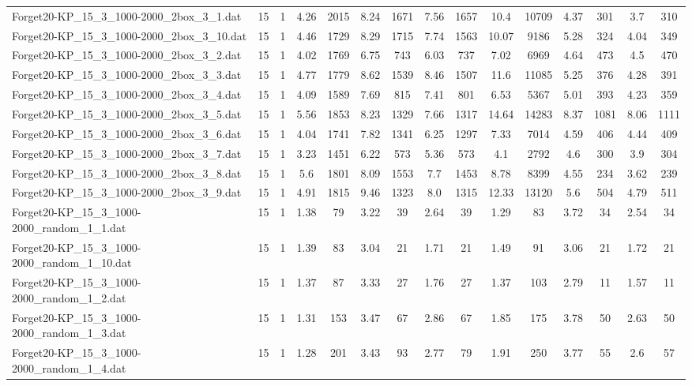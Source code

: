 \begin{table}[!ht]
{\begin{tabular}{lcccccccccccccc}
Forget20-KP\_15\_3\_1000-2000\_2box\_3\_1.dat & 15 & 1 & 4.26 & 2015 & 8.24 & 1671 & 7.56 & 1657 & 10.4 & 10709 & 4.37 & 301 & 3.7 & 310 \\
Forget20-KP\_15\_3\_1000-2000\_2box\_3\_10.dat & 15 & 1 & 4.46 & 1729 & 8.29 & 1715 & 7.74 & 1563 & 10.07 & 9186 & 5.28 & 324 & 4.04 & 349 \\
Forget20-KP\_15\_3\_1000-2000\_2box\_3\_2.dat & 15 & 1 & 4.02 & 1769 & 6.75 & 743 & 6.03 & 737 & 7.02 & 6969 & 4.64 & 473 & 4.5 & 470 \\
Forget20-KP\_15\_3\_1000-2000\_2box\_3\_3.dat & 15 & 1 & 4.77 & 1779 & 8.62 & 1539 & 8.46 & 1507 & 11.6 & 11085 & 5.25 & 376 & 4.28 & 391 \\
Forget20-KP\_15\_3\_1000-2000\_2box\_3\_4.dat & 15 & 1 & 4.09 & 1589 & 7.69 & 815 & 7.41 & 801 & 6.53 & 5367 & 5.01 & 393 & 4.23 & 359 \\
Forget20-KP\_15\_3\_1000-2000\_2box\_3\_5.dat & 15 & 1 & 5.56 & 1853 & 8.23 & 1329 & 7.66 & 1317 & 14.64 & 14283 & 8.37 & 1081 & 8.06 & 1111 \\
Forget20-KP\_15\_3\_1000-2000\_2box\_3\_6.dat & 15 & 1 & 4.04 & 1741 & 7.82 & 1341 & 6.25 & 1297 & 7.33 & 7014 & 4.59 & 406 & 4.44 & 409 \\
Forget20-KP\_15\_3\_1000-2000\_2box\_3\_7.dat & 15 & 1 & 3.23 & 1451 & 6.22 & 573 & 5.36 & 573 & 4.1 & 2792 & 4.6 & 300 & 3.9 & 304 \\
Forget20-KP\_15\_3\_1000-2000\_2box\_3\_8.dat & 15 & 1 & 5.6 & 1801 & 8.09 & 1553 & 7.7 & 1453 & 8.78 & 8399 & 4.55 & 234 & 3.62 & 239 \\
Forget20-KP\_15\_3\_1000-2000\_2box\_3\_9.dat & 15 & 1 & 4.91 & 1815 & 9.46 & 1323 & 8.0 & 1315 & 12.33 & 13120 & 5.6 & 504 & 4.79 & 511 \\
Forget20-KP\_15\_3\_1000-2000\_random\_1\_1.dat & 15 & 1 & 1.38 & 79 & 3.22 & 39 & 2.64 & 39 & 1.29 & 83 & 3.72 & 34 & 2.54 & 34 \\
Forget20-KP\_15\_3\_1000-2000\_random\_1\_10.dat & 15 & 1 & 1.39 & 83 & 3.04 & 21 & 1.71 & 21 & 1.49 & 91 & 3.06 & 21 & 1.72 & 21 \\
Forget20-KP\_15\_3\_1000-2000\_random\_1\_2.dat & 15 & 1 & 1.37 & 87 & 3.33 & 27 & 1.76 & 27 & 1.37 & 103 & 2.79 & 11 & 1.57 & 11 \\
Forget20-KP\_15\_3\_1000-2000\_random\_1\_3.dat & 15 & 1 & 1.31 & 153 & 3.47 & 67 & 2.86 & 67 & 1.85 & 175 & 3.78 & 50 & 2.63 & 50 \\
Forget20-KP\_15\_3\_1000-2000\_random\_1\_4.dat & 15 & 1 & 1.28 & 201 & 3.43 & 93 & 2.77 & 79 & 1.91 & 250 & 3.77 & 55 & 2.6 & 57 \\

\end{tabular}}
\end{table}
